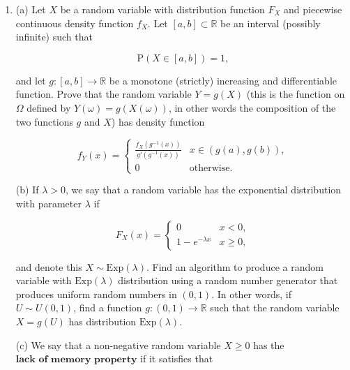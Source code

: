 \documentclass[11pt]{report}
\providecommand{\cal}{\mathcal}
\newcommand{\R}{\mathbb{R}}
\theoremstyle{plain}
\theoremstyle{definition}
\begin{document}
\begin{enumerate}[label=\arabic*.]
The $\sigma$-algebra $\sigma({\cal A})$ is called the
$\textbf{$\sigma$-algebra generated by } {\cal A}$.

$\textbf{Hint for (b).}$ Let $({\cal F}_i)_{i\in I}$
be the collection of all $\sigma$-algebras of subsets
of $\Omega$ that contain ${\cal A}$. This is a
non-empty collection, since it contains for example
${\cal P}(\Omega)$, the set of all subsets of
$\Omega$. Any $\sigma$-algebra $\sigma({\cal A})$
that satisfies the two properties above is necessarily
a subset of any of the ${\cal F}_i$'s, hence it is
also contained in the intersection of all the
${\cal F}_i$'s, which is a $\sigma$-algebra by part
(a) of the question.

\item (a) Let $X$ be a random variable with distribution
function $F_X$ and piecewise continuous density
function $f_X$. Let $[a,b] \subset \R$ be an interval
(possibly infinite) such that

\[
\mathrm{P}(X \in [a,b]) = 1,
\]

and let $g:[a,b]\to\R$ be a monotone (strictly)
increasing and differentiable function. Prove that the
random variable $Y=g(X)$ (this is the function on
$\Omega$ defined by $Y(\omega) = g(X(\omega))$, in
other words the composition of the two functions $g$
and $X$) has density function

\[
f_Y(x) = \begin{cases} \frac{f_X(g^{-1}(x))}{g'(g^{-1}(x))} & x\in (g(a),g(b)), \\ 0 & \textrm{otherwise.} \end{cases}
\]

(b) If $\lambda>0$, we say that a random variable has
the exponential distribution with parameter $\lambda$
if

\[
F_X(x) = \begin{cases} 0 & x<0, \\ 1-e^{-\lambda x} & x \ge 0, \end{cases}
\]

and denote this $X \sim \textrm{Exp}(\lambda).$ Find
an algorithm to produce a random variable with
$\textrm{Exp}(\lambda)$ distribution using a random
number generator that produces uniform random numbers
in $(0,1)$. In other words, if $U \sim U(0,1)$, find
a function $g:(0,1)\to\R$ such that the random
variable $X=g(U)$ has distribution
$\textrm{Exp}(\lambda)$.

(c) We say that a non-negative random variable
$X\ge 0$ has the $\textbf{lack of memory property}$
if it satisfies that


\end{enumerate}
\end{document}
